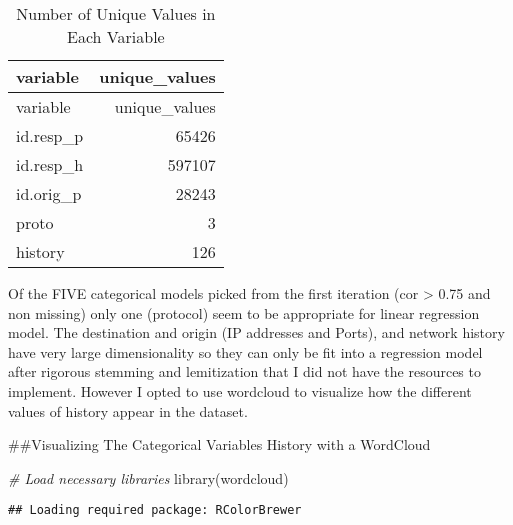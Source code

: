 \documentclass[
]{article}
\newenvironment{Shaded}{\begin{snugshade}}{\end{snugshade}}
\newcommand{\CommentTok}[1]{\textcolor[rgb]{0.56,0.35,0.01}{\textit{#1}}}
\newcommand{\FunctionTok}[1]{\textcolor[rgb]{0.00,0.00,0.00}{#1}}
\newcommand{\NormalTok}[1]{#1}
\begin{document}
\begin{longtable}[]{@{}lr@{}}
\caption{Number of Unique Values in Each Variable}\tabularnewline
\toprule()
variable & unique\_values \\
\midrule()
\endfirsthead
\toprule()
variable & unique\_values \\
\midrule()
\endhead
id.resp\_p & 65426 \\
id.resp\_h & 597107 \\
id.orig\_p & 28243 \\
proto & 3 \\
history & 126 \\
\bottomrule()
\end{longtable}

Of the FIVE categorical models picked from the first iteration (cor
\textgreater{} 0.75 and non missing) only one (protocol) seem to be
appropriate for linear regression model. The destination and origin (IP
addresses and Ports), and network history have very large dimensionality
so they can only be fit into a regression model after rigorous stemming
and lemitization that I did not have the resources to implement. However
I opted to use wordcloud to visualize how the different values of
history appear in the dataset.

\#\#Visualizing The Categorical Variables History with a WordCloud

\begin{Shaded}
\begin{Highlighting}[]
\CommentTok{\# Load necessary libraries}
\FunctionTok{library}\NormalTok{(wordcloud)}
\end{Highlighting}
\end{Shaded}

\begin{verbatim}
## Loading required package: RColorBrewer
\end{verbatim}
\end{document}
